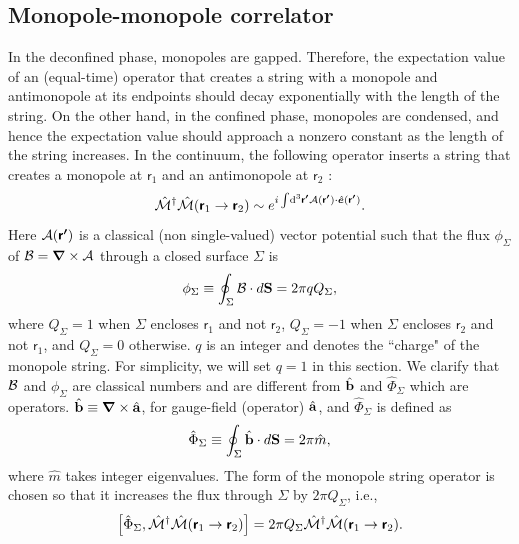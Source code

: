 \documentclass[twocolumn,superscriptaddress,amsmath,amssymb,aps,prx,nofootinbib]{revtex4-2}
\newcommand{\dual}[1]{\boldsymbol{\mathsf{#1}}}
\begin{document}
\subsection{Monopole-monopole correlator}\label{sec:monopole}
In the deconfined phase, monopoles are gapped. Therefore, the expectation value of an (equal-time) operator that creates a string with a monopole and antimonopole at its endpoints should decay exponentially with the length of the string. On the other hand, in the confined phase, monopoles are condensed, and hence the expectation value should approach a nonzero constant as the length of the string increases. In the continuum, the following operator inserts a string that creates a monopole at $\dual{r}_1$ and an antimonopole at $\dual{r}_2$ \cite{hermele2004}:
\begin{equation}\label{eq:monopolestring}
    \hat{\mathcal{M}}^\dagger \hat{\mathcal{M}} (\dual{r}_1 \rightarrow \dual{r}_2)\sim e^{i\int \dd[3]{\dual{r'}}\vb{\mathcal{A}}(\dual{r'})\cdot \hat{\boldsymbol{e}}(\dual{r'})}. 
\end{equation}
Here $\vb{\mathcal{A}}(\dual{r'})$ is a classical (non single-valued) vector potential such that the flux $\phi_{\Sigma}$ of $\vb{\mathcal{B}}=\grad \times \vb{\mathcal{A}}$ through a closed surface $\Sigma$ is 
\begin{equation}\label{eq:fluxcondition}
    \phi_{\Sigma}\equiv \oint_{\Sigma} \vb{\mathcal{B}}\cdot d\vb{S}=2\pi q Q_{\Sigma},
\end{equation}
where $Q_{\Sigma}=1$ when $\Sigma$ encloses $\dual{r}_1$ and not $\dual{r}_2$, $Q_{\Sigma}=-1$ when $\Sigma$ encloses $\dual{r}_2$ and not $\dual{r}_1$, and $Q_{\Sigma}=0$ otherwise. $q$ is an integer and denotes the ``charge" of the monopole string.  For simplicity, we will set $q=1$ in this section. We clarify that $\vb{\mathcal{B}}$ and $\phi_\Sigma$ are classical numbers and are different from $\hat{\vb{b}}$ and $\hat{\Phi}_{\Sigma}$ which are operators. $\hat{\vb{b}}\equiv \grad \times \hat{\vb{a}}$, for gauge-field (operator) $\hat{\vb{a}}$, and $\hat{\Phi}_{\Sigma}$ is defined as
\begin{equation}
    \hat{\Phi}_{\Sigma}\equiv \oint_{\Sigma} \hat{\vb{b}}\cdot d\vb{S}=2\pi \hat{m},
\end{equation}
where $\hat{m}$ takes integer eigenvalues.
The form of the monopole string operator is chosen so that it increases the flux through $\Sigma$ by $2 \pi Q_\Sigma$, i.e.,
\begin{equation}
    \comm{\hat{\Phi}_{\Sigma}}{\hat{\mathcal{M}}^\dagger \hat{\mathcal{M}} (\dual{r}_1 \rightarrow \dual{r}_2)}=2\pi Q_{\Sigma} \hat{\mathcal{M}}^\dagger \hat{\mathcal{M}}(\dual{r}_1 \rightarrow \dual{r}_2).
\end{equation}
\end{document}
